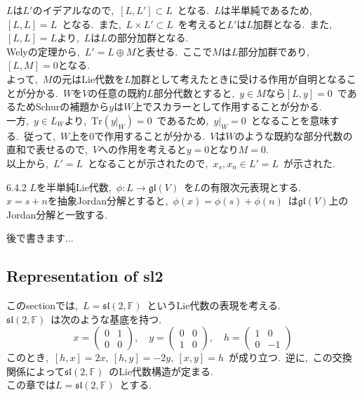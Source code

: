 \documentclass[uplatex,dvipdfmx]{jsarticle}
\begin{document}
\begin{myproof}
    $L$は$L'$のイデアルなので,~$[L,L'] \subset L$~となる.~$L$は半単純であるため,~$[L,L] = L$~となる.~また,~$L\times L' \subset L$~を考えると$L'$は$L$加群となる.~また,~$[L,L]= L$より,~$L$は$L$の部分加群となる.\\
    Welyの定理から,~$L' = L \oplus M$と表せる.~ここで$M$は$L$部分加群であり,~$[L,M] = 0$となる.\\
    よって,~$M$の元はLie代数を$L$加群として考えたときに受ける作用が自明となることが分かる.~$W$を$V$の任意の既約$L$部分代数とすると,~$y\in M$なら$[L,y] = 0$~であるためSchurの補題から$y$は$W$上でスカラーとして作用することが分かる.\\
    一方,~$y \in L_W$より,~$\text{Tr}(y|_W) = 0$~であるため,~$y|_W = 0$~となることを意味する.~従って,~$W$上を0で作用することが分かる.~$V$は$W$のような既約な部分代数の直和で表せるので,~$V$への作用を考えると$y=0$となり$M=0$.\\
    以上から,~$L' = L$~となることが示されたので,~$x_s,x_n \in L'= L$~が示された.
\end{myproof}
\begin{mycor}{6.4.2}
    $L$を半単純Lie代数,~$\phi: L \to \mathfrak{gl}(V)$~を$L$の有限次元表現とする.\\
    $x = s+ n$を抽象Jordan分解とすると,~$\phi(x) = \phi(s) + \phi(n)$~は$\mathfrak{gl}(V)$上のJordan分解と一致する.
\end{mycor}
\begin{myproof}
    後で書きます...
\end{myproof}
\newpage
\subsection{Representation of sl2}
このsectionでは,~$L = \mathfrak{sl}(2,\mathbb{F})$~というLie代数の表現を考える.\\
$\mathfrak{sl}(2,\mathbb{F})$~は次のような基底を持つ.
\begin{equation*}
    x = \begin{pmatrix}
        0 & 1 \\
        0 & 0
    \end{pmatrix}, \quad
    y = \begin{pmatrix}
        0 & 0 \\
        1 & 0
    \end{pmatrix}, \quad
    h = \begin{pmatrix}
        1 & 0 \\
        0 & -1
    \end{pmatrix}
\end{equation*}
このとき,~$[h,x] = 2x,~[h,y] = -2y,~[x,y] = h$~が成り立つ.~逆に,~この交換関係によって$\mathfrak{sl}(2,\mathbb{F})$~のLie代数構造が定まる.\\
この章では$L = \mathfrak{sl}(2,\mathbb{F})$~とする.
\end{document}
